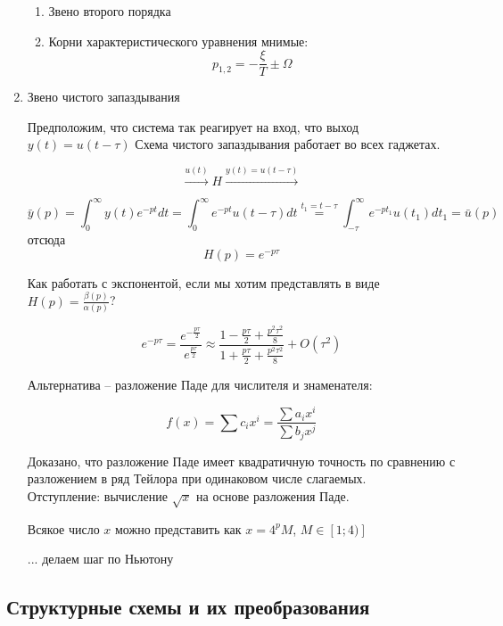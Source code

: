 \documentclass[main.tex]{subfiles}
\begin{document}
\begin{enumerate}[noitemsep]
    \begin{enumerate}[noitemsep]
        \item Звено второго порядка
        \item Корни характеристического уравнения мнимые:
        $$ p_{1,2} = - \frac{\xi}{T} \pm \Omega $$
    \end{enumerate}

    \item Звено чистого запаздывания

    Предположим, что система так реагирует на вход, что выход $ y(t) = u(t-\tau) $
    Схема чистого запаздывания работает во всех гаджетах.

    $$ \xrightarrow{u(t)} \boxed{H} \xrightarrow{y(t)=u(t-\tau)} $$

    $$ \bar y(p) = \int_{0}^{\infty} y(t)e^{-pt}dt = \int_{0}^{\infty} e^{-pt}u(t-\tau) dt \overset{t_1=t-\tau}= \int_{-\tau}^{\infty}e^{-pt_1}u(t_1)dt_1 = \bar u(p)  $$
    отсюда
    $$ \boxed{H(p)=e^{-p\tau}} $$

    Как работать с экспонентой, если мы хотим представлять в виде $ H(p) = \frac{\beta(p)}{\alpha(p)} $?

    $$ e^{-p\tau} = \frac{e^{-\frac{p\tau}{2}}}{e^{\frac{p\tau}{2}}} \approx \frac{1 - \frac{p\tau}{2} + \frac{p^2\tau^2}{8}}{1 + \frac{p\tau}{2} + \frac{p^2\tau^2}{8}} + O(\tau^2) $$ %

    Альтернатива -- разложение Паде для числителя и знаменателя:

    $$ f(x) = \sum c_ix^i = \frac{\sum a_i x^i}{\sum b_j x^j} $$

    Доказано, что разложение Паде имеет квадратичную точность по сравнению с разложением в ряд Тейлора при одинаковом числе слагаемых.\\

    Отступление: вычисление $ \sqrt x $ на основе разложения Паде.

    Всякое число $ x $ можно представить как $ x = 4^pM $, $M \in [1;4)]$

    ... делаем шаг по Ньютону





\end{enumerate}

\subsection{Структурные схемы и их преобразования}
\end{document}
